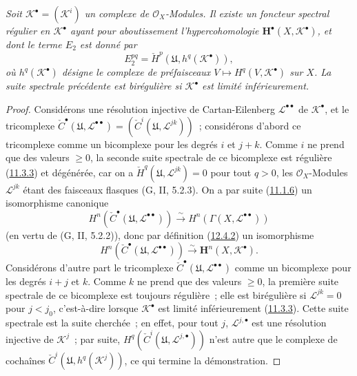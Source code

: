 \begin{proposition}[12.4.6]
\label{0.12.4.6-fr}
\emph{Soit $\mathcal K^\bullet=(\mathcal K^i)$ un complexe de
$\mathcal O_X$-Modules. Il existe un foncteur spectral régulier en
$\mathcal K^\bullet$ ayant pour aboutissement l'hypercohomologie
$\mathbf H^\bullet(X,\mathcal K^\bullet)$, et dont le terme $E_2$ est donné
par}
\begin{equation}
\label{0.12.4.6.1-fr}
\tag{12.4.6.1}
E_2^{pq}=\check H^p(\mathfrak U,h^q(\mathcal K^\bullet)),
\end{equation}
\emph{où $h^q(\mathcal K^\bullet)$ désigne le complexe de préfaisceaux
$V\mapsto H^q(V,\mathcal K^\bullet)$ sur $X$. La suite spectrale précédente
est birégulière si $\mathcal K^\bullet$ est limité inférieurement.}
\end{proposition}

\begin{proof}
Considérons une résolution injective de Cartan-Eilenberg
$\mathcal L^{\bullet\bullet}$ de $\mathcal K^\bullet$, et le tricomplexe
$\check C^\bullet(\mathfrak U,\mathcal L^{\bullet\bullet})
=(\check C^i(\mathfrak U,\mathcal L^{jk}))$~; considérons d'abord ce
tricomplexe comme un bicomplexe pour les degrés $i$ et $j+k$. Comme $i$ ne
prend que des valeurs $\geq0$, la seconde suite spectrale de ce bicomplexe
est régulière (\hyperref[0.11.3.3-fr]{11.3.3}) et dégénérée, car on a
$\check H^q(\mathfrak U,\mathcal L^{jk})=0$ pour tout $q>0$, les
$\mathcal O_X$-Modules $\mathcal L^{jk}$ étant des faisceaux
flasques (G, II, 5.2.3). On a par suite
(\hyperref[0.11.1.6-fr]{11.1.6}) un isomorphisme canonique
\[
H^n(\check C^\bullet(\mathfrak U,\mathcal L^{\bullet\bullet}))
\xrightarrow{\sim}
H^n(\Gamma(X,\mathcal L^{\bullet\bullet}))
\]
(en vertu de (G, II, 5.2.2)), donc par définition
(\hyperref[0.12.4.2-fr]{12.4.2}) un isomorphisme
\[
H^n(\check C^\bullet(\mathfrak U,\mathcal L^{\bullet\bullet}))
\xrightarrow{\sim}\mathbf H^n(X,\mathcal K^\bullet).
\]
Considérons d'autre part le tricomplexe
$\check C^\bullet(\mathfrak U,\mathcal L^{\bullet\bullet})$ comme un
bicomplexe pour les degrés $i+j$ et $k$. Comme $k$ ne prend que des valeurs
$\geq0$, la première suite spectrale de ce bicomplexe est toujours
régulière~; elle est birégulière si $\mathcal L^{jk}=0$ pour $j<j_0$,
c'est-à-dire lorsque $\mathcal K^\bullet$ est limité inférieurement
(\hyperref[0.11.3.3-fr]{11.3.3}). Cette suite spectrale est la suite
cherchée~; en effet, pour tout $j$, $\mathcal L^{j,\bullet}$ est une
résolution injective de $\mathcal K^j$~; par suite,
$H^q(\check C^i(\mathfrak U,\mathcal L^{j,\bullet}))$ n'est autre que le
complexe de cochaînes
$\check C^i(\mathfrak U,h^q(\mathcal K^j))$, ce qui termine la
démonstration.
\end{proof}

